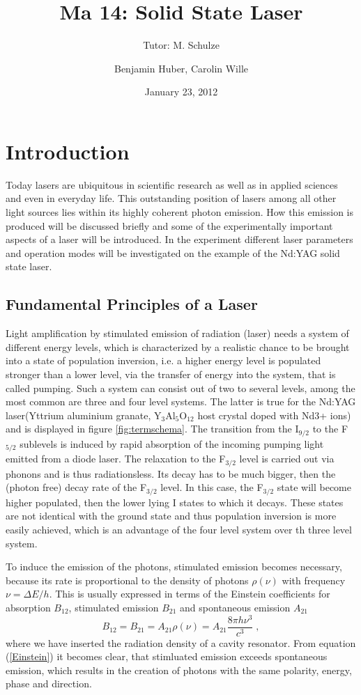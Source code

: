 \documentclass[a4paper]{scrartcl}
\title{Ma 14: Solid State Laser}
\subtitle{Tutor: M. Schulze}
\author{Benjamin Huber, Carolin Wille}
\date{January 23, 2012}
\numberwithin{equation}{section}
\numberwithin{figure}{section}
\numberwithin{table}{section}
\newcommand{\eq}[2]{\begin{equation}#1\label{#2}\end{equation}}
\newcommand{\Formel}[1]{(\ref{#1})}
\begin{document}
\thispagestyle{empty}
\maketitle
\tableofcontents
\clearpage

\section{Introduction}
Today lasers are ubiquitous in scientific research as well as in applied sciences and even in everyday life. This outstanding position of lasers among all other light sources lies within its highly coherent photon emission. How this emission is produced will be discussed briefly and some of the experimentally important aspects of a laser will be introduced. In the experiment different laser parameters and operation modes will be investigated on the example of the Nd:YAG solid state laser.
\subsection{Fundamental Principles of a Laser}
Light amplification by stimulated emission of radiation (laser) needs a system of different energy levels, which is characterized by a realistic chance to be brought into a state of population inversion, i.e. a higher energy level is populated stronger than a lower level, via the transfer of energy into the system, that is called pumping. Such a system can consist out of two to several levels, among the most common are three and four level systems. The latter is true for the Nd:YAG laser(Yttrium aluminium granate, Y$_3$Al$_5$O$_{12}$ host crystal doped with Nd3+ ions) and is displayed in figure \ref{fig:termschema}. The transition from the I$_{9/2}$ to the F$_{5/2}$ sublevels is induced by rapid absorption of the incoming pumping light emitted from a diode laser. The relaxation to the F$_{3/2}$ level is carried out via phonons and is thus radiationsless. Its decay has to be much bigger, then the (photon free) decay rate of the F$_{3/2}$ level. In this case, the F$_{3/2}$ state will become higher populated, then the lower lying I states to which it decays. These states are not identical with the ground state and thus population inversion is more easily achieved, which is an advantage of the four level system over th three level system.

To induce the emission of the photons, stimulated emission becomes necessary, because its rate is proportional to the density of photons $\rho(\nu)$ with frequency $\nu=\Delta E/h$. This is usually expressed in terms of the Einstein coefficients for absorption $B_{12}$, stimulated emission $B_{21}$ and spontaneous emission $A_{21}$
\eq{B_{12}=B_{21}=A_{21} \rho (\nu) =  A_{21} \frac{8 \pi h \nu^3}{c^3} \;, } {Einstein}
where we have inserted the radiation density of a cavity resonator. From equation \Formel{Einstein} it becomes clear, that stimluated emission  exceeds spontaneous emission, which results in the creation of photons with the same polarity, energy, phase and direction.
\end{document}
